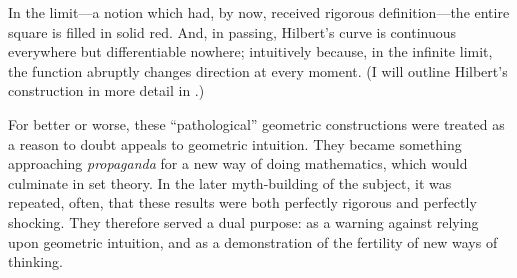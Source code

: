 \documentclass[../../../include/open-logic-section]{subfiles}
\begin{document}
In the limit---a notion which had, by now, received rigorous definition---the entire square is filled in solid red. And, in passing, Hilbert's curve is continuous everywhere but differentiable nowhere; intuitively because, in the infinite limit, the function abruptly changes direction at every moment. (I will outline Hilbert's construction in more detail in .)

For better or worse, these ``pathological'' geometric constructions were treated as a reason to doubt appeals to geometric intuition. They became something approaching \emph{propaganda} for a new way of doing mathematics, which would culminate in set theory. In the later myth-building of the subject, it was repeated, often, that these results were both perfectly rigorous and perfectly shocking. They therefore served a dual purpose: as a warning against relying upon geometric intuition, and as a demonstration of the fertility of new ways of thinking. 
\end{document}
